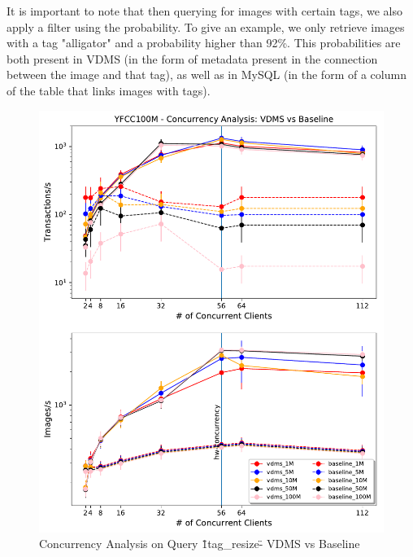It is important to note that then querying for images with certain tags, we
also apply a filter using the probability. To give an example, we only retrieve
images with a tag "alligator" and a probability higher than 92\%.
This probabilities are both present in VDMS (in the form of metadata present
in the connection between the image and that tag), as well as in MySQL (in
the form of a column of the table that links images with tags).

\begin{figure}[]
\centering
\includegraphics[width=\columnwidth]{figures/concurrency_comparison}
\caption{Concurrency Analysis on Query \"1tag\_resize\"- VDMS vs Baseline}
\label{fig:concurrency_vdms}
\end{figure}



